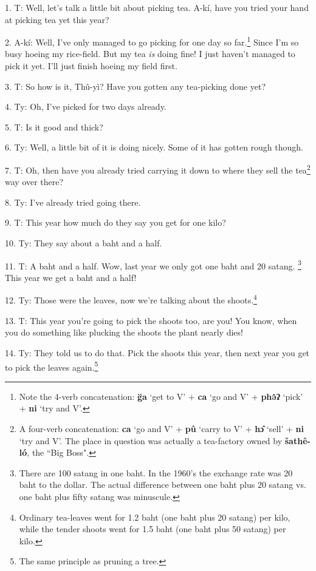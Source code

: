 \setcounter{footnote}{0}


1. T: Well, let's talk a little bit about picking tea. A-kí, have you tried
your hand at picking tea yet this year?

2. A-kí: Well, I've only managed to go picking for one day so far.\footnote{Note the 4-verb concatenation: \textbf{g̈a} `get to V' + \textbf{ca} `go and V' + \textbf{phə̂ʔ} `pick' + \textbf{ni} `try and V'.} Since I'm
so busy hoeing my rice-field. But my tea \textit{is} doing fine! I just haven't
managed to pick it yet. I'll just finish hoeing my field first.

3. T: So how is it, Thû-yì? Have you gotten any tea-picking done yet?

4. Ty: Oh, I've picked for two days already.

5. T: Is it good and thick?

6. Ty: Well, a little bit of it is doing nicely. Some of it has gotten rough though.

7. T: Oh, then have you already tried carrying it down to where they sell the
tea\footnote{A four-verb concatenation: \textbf{ca} `go and V' + \textbf{pû} `carry to V' + \textbf{hɔ̂} `sell' + \textbf{ni} `try and V'. The place in question was actually a tea-factory owned by \textbf{šathê-ló}, the ``Big Boss".} way over there?

8. Ty: I've already tried going there.

9. T: This year how much do they say you get for one kilo?

10. Ty: They say about a baht and a half.

11. T: A baht and a half. Wow, last year we only got one baht and 20 satang.
\footnote{There are 100 satang in one baht. In the 1960's the exchange rate was 20 baht to the dollar. The actual difference between one baht plus 20 satang vs. one baht plus fifty satang was minuscule.} This year we get a baht and a half!

12. Ty: Those were the leaves, now we're talking about the shoots.\footnote{Ordinary tea-leaves went for 1.2 baht (one baht plus 20 satang) per kilo, while the tender shoots went for 1.5 baht (one baht plus 50 satang) per kilo.}

13. T: This year you're going to pick the shoots too, are you! You know, when
you do something like plucking the shoots the plant nearly dies!

14. Ty: They told us to do that. Pick the shoots this year, then next year you
get to pick the leaves again.\footnote{The same principle as pruning a tree.}

